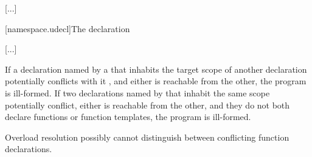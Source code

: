 \documentclass{wg21}
\begin{document}
{\textcolor{noteclr}{[...]}

[namespace.udecl]{The  declaration}%

\textcolor{noteclr}{[...]}

\pnum
If a declaration  named by a 
that inhabits the target scope of another declaration 
potentially conflicts with it , and
either is reachable from the other, the program is ill-formed.
If two declarations named by 
that inhabit the same scope potentially conflict,
either is reachable from the other, and
they do not both declare functions or function templates,
the program is ill-formed.
\begin{note}
    Overload resolution possibly cannot distinguish
    between conflicting function declarations.
\end{note}


%
%

}
\end{document}
